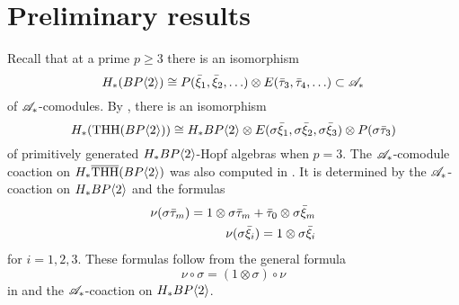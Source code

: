 
\section{Preliminary results}
Recall that at a prime $p \ge 3$ there is an isomorphism
\[H_*(\B)\cong %
P(\bxi_1,\bxi_2,\ldots )\otimes E(\btau_{3},\btau_4,\ldots) \subset \A_*   %
\]
of $\mathscr{A}_*$-comodules. By \cite[Thm. 5.12]{AngeltveitRognes}, there is an isomorphism
\begin{equation}\label{HTHHB} H_*(\THH(\B))\cong %
H_*\B \otimes E(\sig{\bxi_1},\sig{\bxi_2},\sig{\bxi_3})\otimes P(\sig{\btau_3}) %
\end{equation}
of primitively generated $H_*BP\langle 2 \rangle$-Hopf algebras when $p = 3$. The $\mathscr{A}_*$-comodule coaction on $H_*\overline{\operatorname{THH}}(BP\langle 2 \rangle)$ was also computed in \cite[Thm. 5.12]{AngeltveitRognes}. It is determined by the $\mathscr{A}_*$-coaction on $H_*BP\langle 2 \rangle$ and the formulas
\begin{align}
\label{coactp>2} \nu ( \sigma{\bar{\tau}_m}) = 1\otimes \sigma \bar{\tau}_m + \bar{\tau}_0\otimes\sigma{\bar{\xi}_m} \\
\nu ( \sigma{\bar{\xi}_i}) = 1\otimes \sigma \bar{\xi}_i
\end{align}
for $i=1,2,3$. 
These formulas follow from the general formula
\begin{equation}\label{coactsigma} \nu \circ \sigma = (1\otimes \sigma)\circ \nu \end{equation}
in \cite[Eq. 5.11]{AngeltveitRognes} and the $\mathscr{A}_*$-coaction on $H_*BP\langle 2 \rangle$. 

